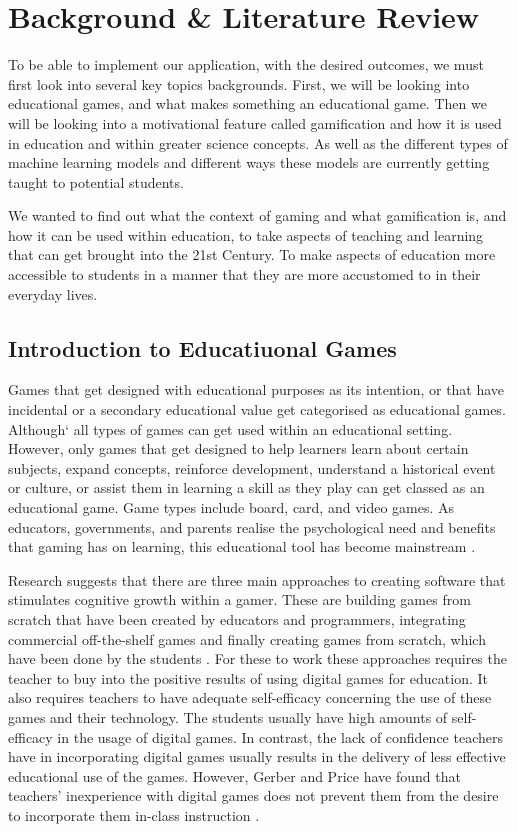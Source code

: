 \chapter{Background \& Literature Review}
	\label{chap:background_lit_review}
	
	To be able to implement our application, with the desired outcomes, we must first look into several key topics backgrounds. First, we will be looking into educational games, and what makes something an educational game. Then we will be looking into a motivational feature called gamification and how it is used in education and within greater science concepts. As well as the different types of machine learning models and different ways these models are currently getting taught to potential students.
	
	We wanted to find out what the context of gaming and what gamification is, and how it can be used within education, to take aspects of teaching and learning that can get brought into the 21st Century. To make aspects of education more accessible to students in a manner that they are more accustomed to in their everyday lives. 
	
	\section{Introduction to Educatiuonal Games}
		\label{sec:intro_to_edu_games}
	
	Games that get designed with educational purposes as its intention, or that have incidental or a secondary educational value get categorised as educational games. Although` all types of games can get used within an educational setting. However, only games that get designed to help learners learn about certain subjects, expand concepts, reinforce development, understand a historical event or culture, or assist them in learning a skill as they play can get classed as an educational game. Game types include board, card, and video games. As educators, governments, and parents realise the psychological need and benefits that gaming has on learning, this educational tool has become mainstream \cite{barab2009transformational}. 
	
	Research suggests that there are three main approaches to creating software that stimulates cognitive growth within a gamer. These are building games from scratch that have been created by educators and programmers, integrating commercial off-the-shelf games and finally creating games from scratch, which have been done by the students \cite{van2006digital}. For these to work these approaches requires the teacher to buy into the positive results of using digital games for education. It also requires teachers to have adequate self-efficacy concerning the use of these games and their technology. The students usually have high amounts of self-efficacy in the usage of digital games. In contrast, the lack of confidence teachers have in incorporating digital games usually results in the delivery of less effective educational use of the games. However, Gerber and Price have found that teachers' inexperience with digital games does not prevent them from the desire to incorporate them in-class instruction \cite{gerber2013fighting}.
	
